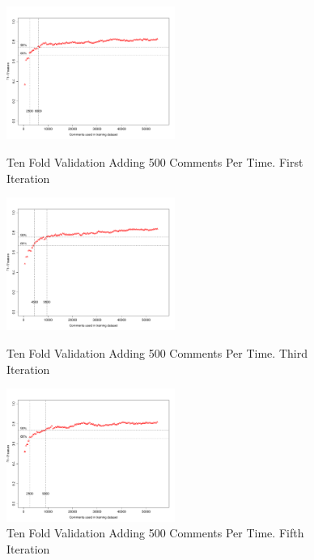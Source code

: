 \clearpage
\begin{figure}[thb!]
  \centering
  \vspace{-3mm}
  \includegraphics[width=0.49\textwidth]{figures/appendix/ten_fold_validation_design/ten_fold_validation_0_500.pdf}
  \vspace{-5mm}
  \caption{Ten Fold Validation Adding 500 Comments Per Time. First Iteration}
  \label{fig:design_ten_fold_validation_0_100}
  \includegraphics[width=0.49\textwidth]{figures/appendix/ten_fold_validation_design/ten_fold_validation_2_500.pdf}
  \vspace{-5mm}
  \caption{Ten Fold Validation Adding 500 Comments Per Time. Third Iteration}
  \label{fig:design_ten_fold_validation_2_100}
  \includegraphics[width=0.49\textwidth]{figures/appendix/ten_fold_validation_design/ten_fold_validation_4_500.pdf}
  \vspace{-5mm}
  \caption{Ten Fold Validation Adding 500 Comments Per Time. Fifth Iteration}
  \label{fig:design_ten_fold_validation_4_100}
\end{figure}

